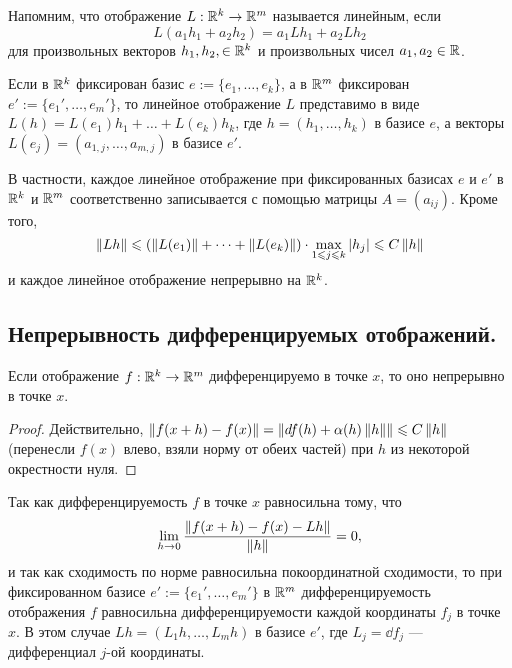 \documentclass[a4paper]{article}
\theoremstyle{named}
\begin{document}
    \begin{remark*}
        Напомним, что отображение $L: \mathbb{R}^k \to \mathbb{R}^m$ называется линейным, если
        \begin{equation*}
            L(a_1h_1 + a_2h_2) = a_1Lh_1 + a_2Lh_2
        \end{equation*}
        для произвольных векторов $h_1, h_2, \in \mathbb{R}^k$ и произвольных чисел $a_1, a_2 \in \mathbb{R}$. 
        
        Если в $\mathbb{R}^k$ фиксирован базис $e := \{e_1, \dots, e_k\}$, а в $\mathbb{R}^m$ фиксирован $e' := \{e_1', \dots, e_m'\}$, то линейное отображение $L$ представимо в виде $L(h) = L(e_1)h_1 + \dots + L(e_k)h_k$, где $h = (h_1, \dots, h_k)$ в базисе $e$, а векторы $L(e_j) = (a_{1,j}, \dots, a_{m, j})$ в базисе $e'$. 

        В частности, каждое линейное отображение при фиксированных базисах $e$ и $e'$ в $\mathbb{R}^k$ и $\mathbb{R}^m$ соответственно записывается с помощью матрицы $A = (a_{ij})$. Кроме того,
        \begin{equation*}
            \left\lVert Lh\right\rVert \leqslant (\left\lVert L(e_1)\right\rVert + \dots + \left\lVert L(e_k)\right\rVert) \cdot \max\limits_{1 \leqslant j \leqslant k} |h_j| \leqslant C \left\lVert h\right\rVert
        \end{equation*}
        и каждое линейное отображение непрерывно на $\mathbb{R}^k$.
    \end{remark*}

    \subsection{Непрерывность дифференцируемых отображений.}

    \begin{consequence*}
        Если отображение $f: \mathbb{R}^k \to \mathbb{R}^m$ дифференцируемо в точке $x$, то оно непрерывно в точке $x$.
    \end{consequence*}

    \begin{proof}
        Действительно, $\left\lVert f(x + h) - f(x)\right\rVert = \left\lVert\mathop{}\!d f(h) + \alpha(h)\left\lVert h\right\rVert\right\rVert \leqslant C\left\lVert h\right\rVert$ (перенесли $f(x)$ влево, взяли норму от обеих частей) при $h$ из некоторой окрестности нуля.
    \end{proof}

    \begin{remark*}
        Так как дифференцируемость $f$ в точке $x$ равносильна тому, что
        \begin{equation*}
            \lim_{h \to 0} \dfrac{\left\lVert f(x + h) - f(x) - Lh\right\rVert}{\left\lVert h\right\rVert} = 0,
        \end{equation*}
        и так как сходимость по норме равносильна покоординатной сходимости, то при фиксированном базисе $e' := \{e_1', \dots, e_m'\}$ в $\mathbb{R}^m$ дифференцируемость отображения $f$ равносильна дифференцируемости каждой координаты $f_j$ в точке $x$. В этом случае $Lh = (L_1h, \dots, L_mh)$ в базисе $e'$, где $L_j = \dd f_j$ --- дифференциал $j$-ой координаты.
    \end{remark*}
\end{document}
